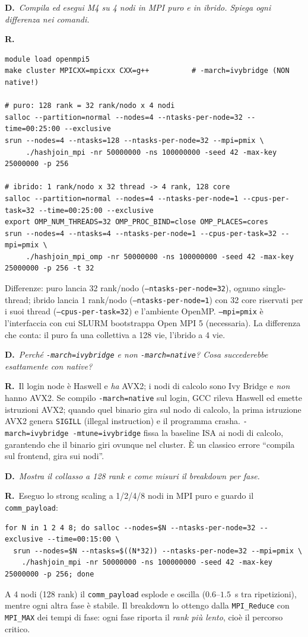 \documentclass[11pt,a4paper]{article}
\newcommand{\D}[1]{\begin{dom}\small\textbf{D.}\ \itshape #1\end{dom}}
\newcommand{\R}{\noindent\textbf{R.}\ }
\begin{document}
\D{Compila ed esegui M4 su 4 nodi in MPI puro e in ibrido. Spiega ogni differenza nei comandi.}
\R
\begin{lstlisting}[style=bash]
module load openmpi5
make cluster MPICXX=mpicxx CXX=g++          # -march=ivybridge (NON native!)

# puro: 128 rank = 32 rank/nodo x 4 nodi
salloc --partition=normal --nodes=4 --ntasks-per-node=32 --time=00:25:00 --exclusive
srun --nodes=4 --ntasks=128 --ntasks-per-node=32 --mpi=pmix \
     ./hashjoin_mpi -nr 50000000 -ns 100000000 -seed 42 -max-key 25000000 -p 256

# ibrido: 1 rank/nodo x 32 thread -> 4 rank, 128 core
salloc --partition=normal --nodes=4 --ntasks-per-node=1 --cpus-per-task=32 --time=00:25:00 --exclusive
export OMP_NUM_THREADS=32 OMP_PROC_BIND=close OMP_PLACES=cores
srun --nodes=4 --ntasks=4 --ntasks-per-node=1 --cpus-per-task=32 --mpi=pmix \
     ./hashjoin_mpi_omp -nr 50000000 -ns 100000000 -seed 42 -max-key 25000000 -p 256 -t 32
\end{lstlisting}
Differenze: puro lancia 32 rank/nodo (\texttt{--ntasks-per-node=32}), ognuno single-thread; ibrido lancia 1 rank/nodo (\texttt{--ntasks-per-node=1}) con 32 core riservati per i suoi thread (\texttt{--cpus-per-task=32}) e l'ambiente OpenMP. \texttt{--mpi=pmix} è l'interfaccia con cui SLURM bootstrappa Open MPI 5 (necessaria). La differenza che conta: il puro fa una collettiva a 128 vie, l'ibrido a 4 vie.

\D{Perché \texttt{-march=ivybridge} e non \texttt{-march=native}? Cosa succederebbe esattamente con native?}
\R Il login node è Haswell e \emph{ha} AVX2; i nodi di calcolo sono Ivy Bridge e \emph{non} hanno AVX2. Se compilo \texttt{-march=native} sul login, GCC rileva Haswell ed emette istruzioni AVX2; quando quel binario gira sul nodo di calcolo, la prima istruzione AVX2 genera \texttt{SIGILL} (illegal instruction) e il programma crasha. \texttt{-march=ivybridge -mtune=ivybridge} fissa la baseline ISA ai nodi di calcolo, garantendo che il binario giri ovunque nel cluster. È un classico errore ``compila sul frontend, gira sui nodi''.

\D{Mostra il collasso a 128 rank e come misuri il breakdown per fase.}
\R Eseguo lo strong scaling a 1/2/4/8 nodi in MPI puro e guardo il \texttt{comm\_payload}:
\begin{lstlisting}[style=bash]
for N in 1 2 4 8; do salloc --nodes=$N --ntasks-per-node=32 --exclusive --time=00:15:00 \
  srun --nodes=$N --ntasks=$((N*32)) --ntasks-per-node=32 --mpi=pmix \
    ./hashjoin_mpi -nr 50000000 -ns 100000000 -seed 42 -max-key 25000000 -p 256; done
\end{lstlisting}
A 4 nodi (128 rank) il \texttt{comm\_payload} esplode e oscilla ($0.6$--$1.5$~s tra ripetizioni), mentre ogni altra fase è stabile. Il breakdown lo ottengo dalla \texttt{MPI\_Reduce} con \texttt{MPI\_MAX} dei tempi di fase: ogni fase riporta il \emph{rank più lento}, cioè il percorso critico.
\end{document}
